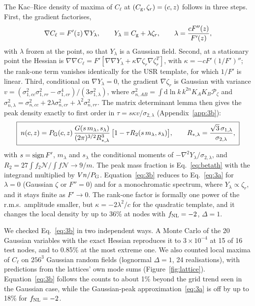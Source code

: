 \documentclass{article}
\newcommand{\Cg}{C_{\rm g}}
\newcommand{\Cl}{C_{\ell}}
\newcommand{\zr}{\zeta_r}
\newcommand{\dd}{\mathrm{d}}
\newcommand{\fnl}{f_{\rm NL}}
\newcommand{\Pz}{\mathcal{P}_\zeta}
\begin{document}
The Kac--Rice density of maxima of $\Cl$ at $(\Cg,\zr)=(c,z)$ follows in three steps. First, the
gradient factorises,
\begin{equation}
\nabla\Cl=F'(z)\,\nabla Y_\lambda,\qquad Y_\lambda\equiv\Cg+\lambda\zr,\qquad \lambda=\frac{cF''(z)}{F'(z)},
\end{equation}
with $\lambda$ frozen at the point, so that $Y_\lambda$ is a Gaussian field. Second, at a
stationary point the Hessian is $\nabla\nabla\Cl=F'[\nabla\nabla Y_\lambda+\kappa\nabla\zr\nabla\zr^T]$,
with $\kappa=-cF'(1/F')''$; the rank-one term vanishes identically for the USR template, for which
$1/F'$ is linear. Third, conditional on $\nabla Y_\lambda=0$, the gradient $\nabla\zr$ is Gaussian
with variance $v=(\sigma^2_{1,cc}\sigma^2_{1,rr}-\sigma^4_{1,cr})/(3\sigma^2_{1,\lambda})$, where
$\sigma^2_{n,AB}=\int\dd\ln k\,k^{2n}K_AK_B\Pz$ and
$\sigma^2_{n,\lambda}=\sigma^2_{n,cc}+2\lambda\sigma^2_{n,cr}+\lambda^2\sigma^2_{n,rr}$. The matrix
determinant lemma then gives the peak density exactly to first order in
$\tau=s\kappa v/\sigma_{2,\lambda}$ (Appendix~\ref{app:3b}):
\begin{equation}
\boxed{\;n(c,z)=P_{\rm G}(c,z)\,\frac{G(s\,m_\lambda,s_\lambda)}{(2\pi)^{3/2}R_{*,\lambda}^3}\,
\big[1-\tau R_2(s\,m_\lambda,s_\lambda)\big],\qquad R_{*,\lambda}=\frac{\sqrt3\,\sigma_{1,\lambda}}{\sigma_{2,\lambda}},\;}
\label{eq:3b}
\end{equation}
with $s={\rm sign}\,F'$, $m_\lambda$ and $s_\lambda$ the conditional moments of
$-\nabla^2Y_\lambda/\sigma_{2,\lambda}$, and $R_2=27\int f_2\mathcal N/\int f\mathcal N\to9/m$. The
peak mass fraction is Eq.~\eqref{eq:betath} with the integrand multiplied by $Vn/P_{\rm G}$.
Equation~\eqref{eq:3b} reduces to Eq.~\eqref{eq:3a} for $\lambda=0$ (Gaussian $\zeta$ or $F''=0$)
and for a monochromatic spectrum, where $Y_\lambda\propto\zr$, and it stays finite as $F'\to0$.
The rank-one factor is formally one power of the r.m.s.\ amplitude smaller, but
$\kappa=-2\lambda^2/c$ for the quadratic template, and it changes the local density by up to 36\%
at nodes with $\fnl=-2$, $\Delta=1$.

We checked Eq.~\eqref{eq:3b} in two independent ways. A Monte Carlo of the 20 Gaussian variables
with the exact Hessian reproduces it to $3\times10^{-4}$ at 15 of 16 test nodes, and to 0.85\% at
the most extreme one. We also counted local maxima of $\Cl$ on $256^3$ Gaussian random fields
(lognormal $\Delta=1$, 24 realisations), with predictions from the lattices' own mode sums
(Figure~\ref{fig:lattice}). Equation~\eqref{eq:3b} follows the counts to about 1\% beyond the grid
trend seen in the Gaussian case, while the Gaussian-peak approximation~\eqref{eq:3a} is off by up
to 18\% for $\fnl=-2$.
\end{document}
